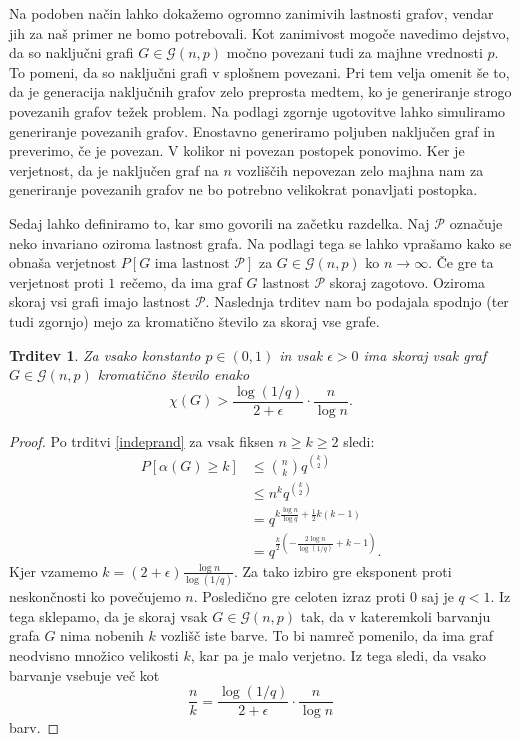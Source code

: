 \documentclass[12pt,a4paper,twoside]{article}
\theoremstyle{definition} %
\theoremstyle{plain} %
\newtheorem{trditev}[definicija]{Trditev}
\numberwithin{equation}{section}  %
\begin{document}
Na podoben način lahko dokažemo ogromno zanimivih lastnosti grafov, vendar jih za naš primer ne bomo potrebovali. Kot zanimivost mogoče navedimo dejstvo, da so naključni grafi $G \in \mathcal{G}(n, p)$ močno povezani tudi za majhne vrednosti $p$. To pomeni, da so naključni grafi v splošnem povezani. Pri tem velja omenit še to, da je generacija naključnih grafov zelo preprosta medtem, ko je generiranje strogo povezanih grafov težek problem. Na podlagi zgornje ugotovitve lahko simuliramo generiranje povezanih grafov. Enostavno generiramo poljuben naključen graf in preverimo, če je povezan. V kolikor ni povezan postopek ponovimo. Ker je verjetnost, da je naključen graf na $n$ vozliščih nepovezan zelo majhna nam za generiranje povezanih grafov ne bo potrebno velikokrat ponavljati postopka.

Sedaj lahko definiramo to, kar smo govorili na začetku razdelka. Naj $\mathcal{P}$ označuje neko invariano oziroma lastnost grafa. Na podlagi tega se lahko vprašamo kako se obnaša verjetnost $P[G \text{ ima lastnost } \mathcal{P}]$ za $G \in \mathcal{G}(n, p)$ ko $n \rightarrow \infty$. Če gre ta verjetnost proti $1$ rečemo, da ima graf $G$ lastnost $\mathcal{P}$ skoraj zagotovo. Oziroma skoraj vsi grafi imajo lastnost $\mathcal{P}$. Naslednja trditev nam bo podajala spodnjo (ter tudi zgornjo) mejo za kromatično število za skoraj vse grafe.
\begin{trditev}
Za vsako konstanto $p \in (0,1)$ in vsak $\epsilon > 0$ ima skoraj vsak graf $G \in \mathcal{G}(n, p)$ kromatično število enako
$$ \chi(G) > \frac{\log(1/q)}{2 + \epsilon} \cdot \frac{n}{\log n}. $$
\end{trditev}
\begin{proof}
Po trditvi \ref{indeprand} za vsak fiksen $n \ge k \ge 2$ sledi:
\begin{equation}
\begin{split}
P[\alpha(G) \ge k]  &\le {n \choose k} q ^{k \choose 2} \\
& \le n^k q ^{k \choose 2} \\
&= q^{k \frac{\log n}{\log q} + \frac{1}{2}k(k-1)} \\
&= q^{\frac{k}{2}\left(- \frac{2 \log n}{\log(1/q)} + k - 1\right)}.
\end{split}
\end{equation}
Kjer vzamemo $k = (2 + \epsilon) \frac{\log n}{\log (1/q)}$. Za tako izbiro gre eksponent proti neskončnosti ko povečujemo $n$. Posledično gre celoten izraz proti $0$ saj je $q < 1$. Iz tega sklepamo, da je skoraj vsak $G \in \mathcal{G}(n, p)$ tak, da v kateremkoli barvanju grafa $G$ nima nobenih $k$ vozlišč iste barve. To bi namreč pomenilo, da ima graf neodvisno množico velikosti $k$, kar pa je malo verjetno. Iz tega sledi, da vsako barvanje vsebuje več kot 
$$ \frac{n}{k} = \frac{\log (1/q)}{2 + \epsilon} \cdot \frac{n}{\log n} $$
barv.
\end{proof}
\end{document}
